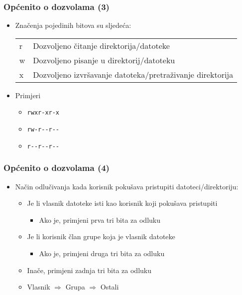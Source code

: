 \documentclass[table,usenames,dvipsnames]{beamer}
\newcommand{\shell}[1]{\texttt{#1}}
\begin{document}
\begin{frame}[t]
\frametitle{Općenito o dozvolama (3)}
\begin{itemize}
  \item Značenja pojedinih bitova su sljedeća:
    \begin{tabular}{l l}
     r &  Dozvoljeno čitanje direktorija/datoteke \\
     w & Dozvoljeno pisanje u direktorij/datoteku \\
     x &  Dozvoljeno izvršavanje datoteka/pretraživanje direktorija
    \end{tabular}
  \item Primjeri
  \begin{itemize}
    \item[] \shell{rwxr-xr-x}
    \item[] \shell{rw-r-{}-r-{}-}
    \item[] \shell{r-{}-r-{}-r-{}-}
  \end{itemize}
\end{itemize}
\end{frame}

\begin{frame}[t]
\frametitle{Općenito o dozvolama (4)}
\begin{itemize}
  \item Način odlučivanja kada korisnik pokušava pristupiti 
        datoteci/direktoriju:
  \begin{itemize}
    \item Je li vlasnik datoteke isti kao korisnik koji pokušava pristupiti
    \begin{itemize}
      \item Ako je, primjeni prva tri bita za odluku
    \end{itemize}
    \item Je li korisnik član grupe koja je vlasnik datoteke
    \begin{itemize}
      \item Ako je, primjeni druga tri bita za odluku
    \end{itemize}
    \item Inače, primjeni zadnja tri bita za odluku
    \item Vlasnik $\Rightarrow$ Grupa $\Rightarrow$ Ostali
  \end{itemize}
\end{itemize}
\end{frame}
\end{document}

